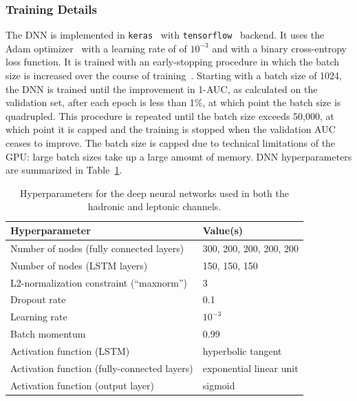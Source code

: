 \subsubsection{Training Details}
The DNN is implemented in \texttt{keras}~\cite{keras} with \texttt{tensorflow}~\cite{tensorflow} backend.
It uses the Adam optimizer~\cite{adam} with a learning rate of of $10^{-3}$ and with a binary cross-entropy loss function.
It is trained with an early-stopping procedure in which the batch size is increased over the course of training~\cite{increase_batch}.
Starting with a batch size of 1024, the DNN is trained until the improvement in 1-AUC, as calculated on the validation set, after each epoch is less than 1\%, at which point the batch size is quadrupled.
This procedure is repeated until the batch size exceeds 50,000, at which point it is capped and the training is stopped when the validation AUC ceases to improve.
The batch size is capped due to technical limitations of the GPU: large batch sizes take up a large amount of memory.
DNN hyperparameters are summarized in Table~\ref{tab:tth_dnn_hyperparams}.

\begin{table} [h]
    \centering
    \begin{tabular}{l l}
        Hyperparameter & Value(s) \\ \hline
        Number of nodes (fully connected layers) & 300, 200, 200, 200, 200 \\
        Number of nodes (LSTM layers) & 150, 150, 150 \\
        L2-normalization constraint (``maxnorm'') & 3 \\
        Dropout rate & 0.1 \\
        Learning rate & $10^{-3}$ \\
        Batch momentum & 0.99 \\
        Activation function (LSTM) & hyperbolic tangent \\
        Activation function (fully-connected layers) & exponential linear unit \\
        Activation function (output layer) & sigmoid \\
    \end{tabular}
    \caption{Hyperparameters for the deep neural networks used in both the hadronic and leptonic channels.}
    \label{tab:tth_dnn_hyperparams}
\end{table}

